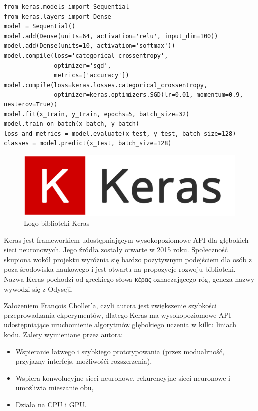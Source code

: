 \documentclass[12pt,a4paper,twoside,titlepage,openright]{book}
\begin{document}
\noindent
\begin{minipage}{\linewidth}
\begin{lstlisting}[caption=Skrypt najprostszego modelu sekwencyjnego (Keras w 30 sekund), label=lst:test]
from keras.models import Sequential
from keras.layers import Dense
model = Sequential()
model.add(Dense(units=64, activation='relu', input_dim=100))
model.add(Dense(units=10, activation='softmax'))
model.compile(loss='categorical_crossentropy',
              optimizer='sgd',
              metrics=['accuracy'])
model.compile(loss=keras.losses.categorical_crossentropy,
              optimizer=keras.optimizers.SGD(lr=0.01, momentum=0.9, nesterov=True))
model.fit(x_train, y_train, epochs=5, batch_size=32)
model.train_on_batch(x_batch, y_batch)
loss_and_metrics = model.evaluate(x_test, y_test, batch_size=128)
classes = model.predict(x_test, batch_size=128)
\end{lstlisting}
\end{minipage}

\begin{figure}[h]
	\centering
			\includegraphics[resolution=100, scale=0.25]{Keras.png}
		\caption{Logo biblioteki Keras}
\end{figure}

Keras jest frameworkiem udostępniającym wysokopoziomowe API dla głębokich sieci neuronowych. Jego źródła zostały otwarte w 2015 roku. Społeczność skupiona wokół projektu wyróżnia się bardzo pozytywnym podejściem dla osób z poza środowiska naukowego i jest otwarta na propozycje rozwoju biblioteki. Nazwa Keras pochodzi od greckiego słowa κέρας oznaczającego róg, geneza nazwy wywodzi się z Odyseji. 

Założeniem François Chollet'a, czyli autora jest zwiększenie szybkości przeprowadzania ekperymentów, dlatego Keras ma wysokopoziomowe API udostępniające uruchomienie algorytmów głębokiego uczenia w kilku liniach kodu. Zalety wymieniane przez autora:
\begin{itemize}
\item Wspieranie łatwego i szybkiego prototypowania (przez modualrność, przyjazny interfejs, możliwośći rozszerzenia),
\item Wspiera konwolucyjne sieci neuronowe, rekurencyjne sieci neuronowe i umożliwia mieszanie obu,
\item Działa na CPU i GPU.
\end{itemize}
\end{document}
